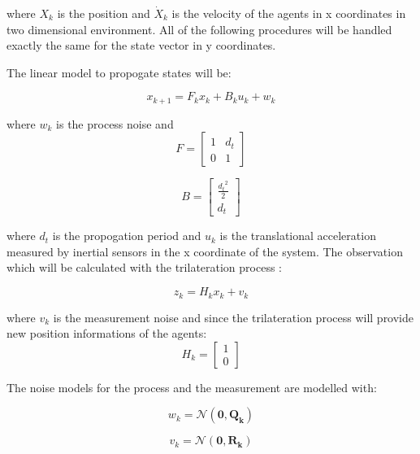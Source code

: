 where $X_k$ is the position and $\dot{X}_k$ is the velocity of the agents in x coordinates in two dimensional environment. All of the following procedures will be handled exactly the same for the state vector in y coordinates.

The linear model to propogate states will be:

\begin{equation}
x_{k+1} = F_k     x_{k} + B_ku_k + w_k
\end{equation}
	
where $w_k$ is the process noise and 
\begin{equation}
F = \begin{bmatrix}
1 & d_t\\
0 & 1
\end{bmatrix}   
\end{equation}
	
\begin{equation}
B = \begin{bmatrix}
\frac{{d_t}^2}{2} \\
d_t
\end{bmatrix}
\end{equation}

where $d_t$ is the propogation period and $u_k$ is the translational acceleration measured by inertial sensors in the x coordinate of the system. The observation which will be calculated with the trilateration process :

\begin{equation}
z_k = H_kx_k + v_k
\end{equation}

where $v_k$ is the measurement noise and since the trilateration process will provide new position informations of the agents:
\begin{equation}
H_k = \begin{bmatrix}
1\\0
\end{bmatrix}
\end{equation}
	
The noise models for the process and the measurement are modelled with:

\begin{equation}
 w_k = \mathcal{N}(\mathbf{0,Q_k})
\end{equation}
	
\begin{equation}
v_k = \mathcal{N}(\mathbf{0,R_k})
\end{equation}
		
